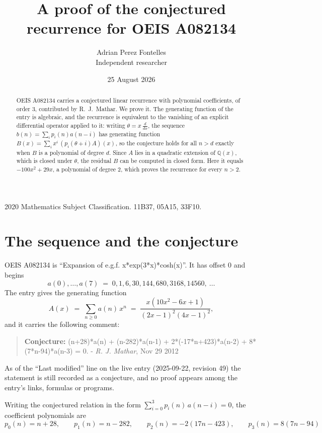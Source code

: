 \documentclass[11pt,a4paper]{article}
\title{A proof of the conjectured recurrence for OEIS A082134}
\author{Adrian Perez Fontelles\\ \small Independent researcher}
\date{25 August 2026}
\theoremstyle{plain}
\theoremstyle{definition}
\begin{document}
\maketitle

\begin{abstract}
OEIS A082134 carries a conjectured linear recurrence with polynomial coefficients, of
order 3, contributed by R.~J.~Mathar. We prove it. The generating function of the
entry is algebraic, and the recurrence is equivalent to the vanishing of an explicit
differential operator applied to it: writing $\theta=x\,\frac{d}{dx}$, the sequence
$b(n)=\sum_{i}p_{i}(n)a(n-i)$ has generating function
$B(x)=\sum_{i}x^{i}\,(p_{i}(\theta+i)A)(x)$, so the conjecture holds for all $n>d$ exactly
when $B$ is a polynomial of degree $d$. Since $A$ lies in a quadratic extension of
$\mathbb{Q}(x)$, which is closed under $\theta$, the residual $B$ can be computed in
closed form. Here it equals $- 100 x^{2} + 29 x$, a polynomial of degree $2$, which proves
the recurrence for every $n>2$.
\end{abstract}

\noindent\small 2020 Mathematics Subject Classification. 11B37, 05A15, 33F10.\normalsize

\section{The sequence and the conjecture}

OEIS A082134 is ``Expansion of e.g.f. x*exp(3*x)*cosh(x)''. It has offset $0$ and begins
\[
a(0),\dots,a(7)\;=\;0, 1, 6, 30, 144, 680, 3168, 14560,\ \dots
\]
The entry gives the generating function
\begin{equation}\label{eq:gf}
A(x)\;=\;\sum_{n\ge 0} a(n)\,x^{n}\;=\;\frac{x \left(10 x^{2} - 6 x + 1\right)}{\left(2 x - 1\right)^{2} \left(4 x - 1\right)^{2}} ,
\end{equation}
and it carries the following comment:
\begin{quote}\small
\textbf{Conjecture:} (n+28)*a(n) + (n-282)*a(n-1) + 2*(-17*n+423)*a(n-2) + 8*(7*n-94)*a(n-3) = 0. - \emph{R. J. Mathar}, Nov 29 2012
\end{quote}
As of the ``Last modified'' line on the live entry (2025-09-22, revision 49) the
statement is still recorded as a conjecture, and no proof appears among the entry's links,
formulas or programs.

Writing the conjectured relation in the form $\sum_{i=0}^{3}p_{i}(n)\,a(n-i)=0$,
the coefficient polynomials are
\[
p_{0}(n)=n + 28,\qquad p_{1}(n)=n - 282,\qquad p_{2}(n)=- 2 \left(17 n - 423\right),\qquad p_{3}(n)=8 \left(7 n - 94\right)
\]
\end{document}
